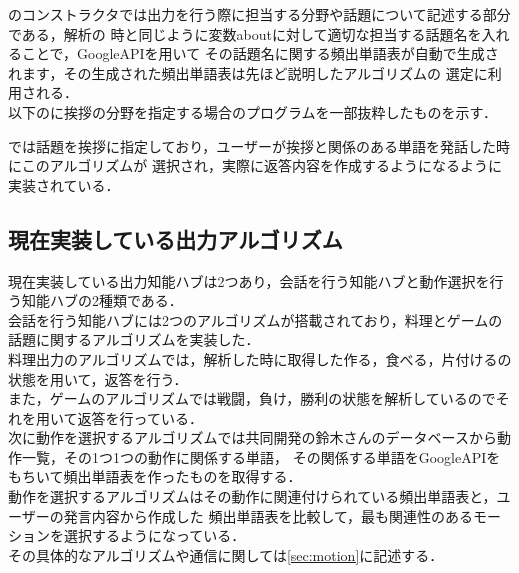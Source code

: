 のコンストラクタでは出力を行う際に担当する分野や話題について記述する部分である，解析の
時と同じように変数aboutに対して適切な担当する話題名を入れることで，GoogleAPIを用いて
その話題名に関する頻出単語表が自動で生成されます，その生成された頻出単語表は先ほど説明したアルゴリズムの
選定に利用される．\\

以下のに挨拶の分野を指定する場合のプログラムを一部抜粋したものを示す．
\\

では話題を挨拶に指定しており，ユーザーが挨拶と関係のある単語を発話した時にこのアルゴリズムが
選択され，実際に返答内容を作成するようになるように実装されている．
\\
\subsection{現在実装している出力アルゴリズム}\label{sec:back}
現在実装している出力知能ハブは2つあり，会話を行う知能ハブと動作選択を行う知能ハブの2種類である．
\\
会話を行う知能ハブには2つのアルゴリズムが搭載されており，料理とゲームの話題に関するアルゴリズムを実装した．
\\
料理出力のアルゴリズムでは，解析した時に取得した作る，食べる，片付けるの状態を用いて，返答を行う．
\\
また，ゲームのアルゴリズムでは戦闘，負け，勝利の状態を解析しているのでそれを用いて返答を行っている．
\\

次に動作を選択するアルゴリズムでは共同開発の鈴木さんのデータベースから動作一覧，その1つ1つの動作に関係する単語，
その関係する単語をGoogleAPIをもちいて頻出単語表を作ったものを取得する．
\\

動作を選択するアルゴリズムはその動作に関連付けられている頻出単語表と，ユーザーの発言内容から作成した
頻出単語表を比較して，最も関連性のあるモーションを選択するようになっている．\\

その具体的なアルゴリズムや通信に関しては\ref{sec:motion}に記述する．\\






